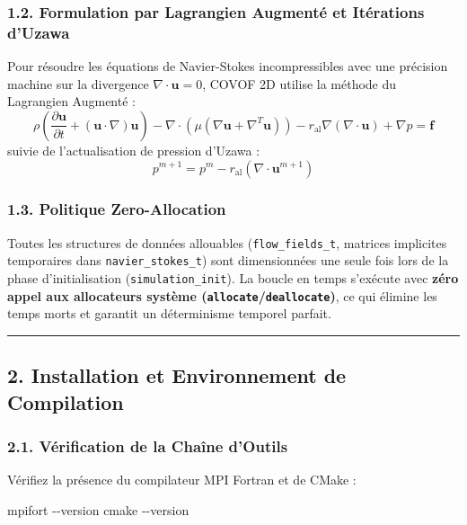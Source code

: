 \documentclass[
  french,
]{article}
\newenvironment{Shaded}{}{}
\newcommand{\AttributeTok}[1]{\textcolor[rgb]{0.49,0.56,0.16}{#1}}
\newcommand{\ExtensionTok}[1]{#1}
\newcommand{\FunctionTok}[1]{\textcolor[rgb]{0.02,0.16,0.49}{#1}}
\begin{document}
\subsubsection{1.2. Formulation par Lagrangien Augmenté et Itérations
d'Uzawa}\label{formulation-par-lagrangien-augmentuxe9-et-ituxe9rations-duzawa}

Pour résoudre les équations de Navier-Stokes incompressibles avec une
précision machine sur la divergence \(\nabla \cdot \mathbf{u} = 0\),
COVOF 2D utilise la méthode du Lagrangien Augmenté :
\[\rho \left( \frac{\partial \mathbf{u}}{\partial t} + (\mathbf{u} \cdot \nabla) \mathbf{u} \right) - \nabla \cdot (\mu (\nabla \mathbf{u} + \nabla^T \mathbf{u})) - r_{\text{al}} \nabla(\nabla \cdot \mathbf{u}) + \nabla p = \mathbf{f}\]
suivie de l'actualisation de pression d'Uzawa :
\[p^{m+1} = p^m - r_{\text{al}} (\nabla \cdot \mathbf{u}^{m+1})\]

\subsubsection{1.3. Politique
Zero-Allocation}\label{politique-zero-allocation}

Toutes les structures de données allouables (\texttt{flow\_fields\_t},
matrices implicites temporaires dans \texttt{navier\_stokes\_t}) sont
dimensionnées une seule fois lors de la phase d'initialisation
(\texttt{simulation\_init}). La boucle en temps s'exécute avec
\textbf{zéro appel aux allocateurs système
(\texttt{allocate}/\texttt{deallocate})}, ce qui élimine les temps morts
et garantit un déterminisme temporel parfait.

\begin{center}\rule{0.5\linewidth}{0.5pt}\end{center}

\subsection{2. Installation et Environnement de
Compilation}\label{installation-et-environnement-de-compilation}

\subsubsection{2.1. Vérification de la Chaîne
d'Outils}\label{vuxe9rification-de-la-chauxeene-doutils}

Vérifiez la présence du compilateur MPI Fortran et de CMake :

\begin{Shaded}
\begin{Highlighting}[]
\ExtensionTok{mpifort} \AttributeTok{{-}{-}version}
\FunctionTok{cmake} \AttributeTok{{-}{-}version}
\end{Highlighting}
\end{Shaded}
\end{document}
